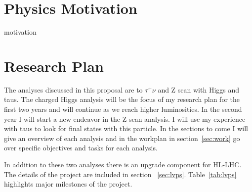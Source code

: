 \documentclass[11pt]{article}
\begin{document}
\section{Physics Motivation}
\label{sec:mot}
 {motivation} 
\section{Research Plan}
\label{sec:anal}
The analyses discussed in this proposal are \Hp to $\tau^+ \nu$ and Z scan with Higgs and taus.  The charged Higgs analysis will be the focus of my research plan for the first two years and will continue as we reach 
higher luminosities.  In the second year I will start a new endeavor in the Z scan analysis.  I will use my experience with taus to look for final states with this particle.  
In the sections to come I will give an overview of each analysis and in the workplan in section~\ref{sec:work} go over specific objectives and tasks for each analysis.

In addition to these two analyses there is an upgrade component for HL-LHC.  The details of the project are included in section ~\ref{sec:lvps}. Table~\ref{tab:lvps} highlights major milestones of the project.
\end{document}
